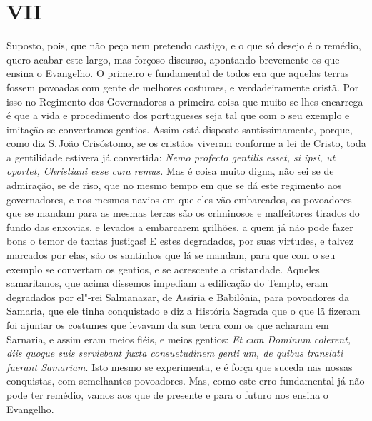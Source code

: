 \section*{VII}

Suposto, pois, que não peço nem pretendo castigo, e o que só desejo é o
remédio, quero acabar este largo, mas forçoso discurso, apontando
brevemente os que ensina o Evangelho. O primeiro e fundamental de todos
era que aquelas terras fossem povoadas com gente de melhores costumes, e
verdadeiramente cristã. Por isso no Regimento dos Governadores a
primeira coisa que muito se lhes encarrega é que a vida e procedimento
dos portugueses seja tal que com o seu exemplo e imitação se convertamos
gentios.
Assim está disposto santissimamente, porque, como diz S.\,João
Crisóstomo, se os cristãos viveram conforme a lei de Cristo, toda a
gentilidade estivera já convertida: \emph{Nemo profecto gentilis esset,
si ipsi, ut oportet, Christiani esse cura remus.} Mas é coisa muito
digna, não sei se de admiração, se de riso, que no mesmo tempo em que se
dá este regimento aos governadores, e nos mesmos navios em que eles vão
embareados, os povoadores que se mandam para as mesmas terras são os
criminosos e malfeitores tirados do fundo das enxovias, e levados a
embarcarem grilhões, a quem já não pode fazer bons o temor de tantas
justiças! E estes degradados, por suas virtudes, e talvez marcados por
elas, são os santinhos que lá se mandam, para que com o seu exemplo se
convertam os gentios, e se acrescente a cristandade. Aqueles
samaritanos, que acima dissemos impediam a edificação do Templo, eram
degradados por el"-rei Salmanazar, de Assíria e Babilônia, para
povoadores da Samaria, que ele tinha conquistado e diz a História
Sagrada que o que lã fizeram foi ajuntar os costumes que levavam da sua
terra com os que acharam em Sarnaria, e assim eram meios fiéis, e meios
gentios: \emph{Et cum Dominum colerent, diis quoque suis serviebant
juxta consuetudinem genti um, de quibus translati fuerant Samariam}.
Isto mesmo se experimenta, e é força que suceda nas nossas
conquistas, com semelhantes povoadores. Mas, como este erro fundamental
já não pode ter remédio, vamos aos que de presente e para o futuro nos
ensina o Evangelho.

